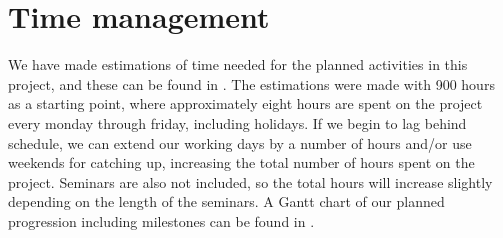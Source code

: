 \documentclass[informationsecurity]{gucmasterproject}
\begin{document}
\section{Time management}
\label{sec:milestones-time}
We have made estimations of time needed for the planned activities in this project, and these can be found in .
The estimations were made with 900 hours as a starting point, where approximately eight hours are spent on the project every monday through friday, including holidays.
If we begin to lag behind schedule, we can extend our working days by a number of hours and/or use weekends for catching up, increasing the total number of hours spent on the project.
Seminars are also not included, so the total hours will increase slightly depending on the length of the seminars.
A Gantt chart of our planned progression including milestones can be found in .
\end{document}
